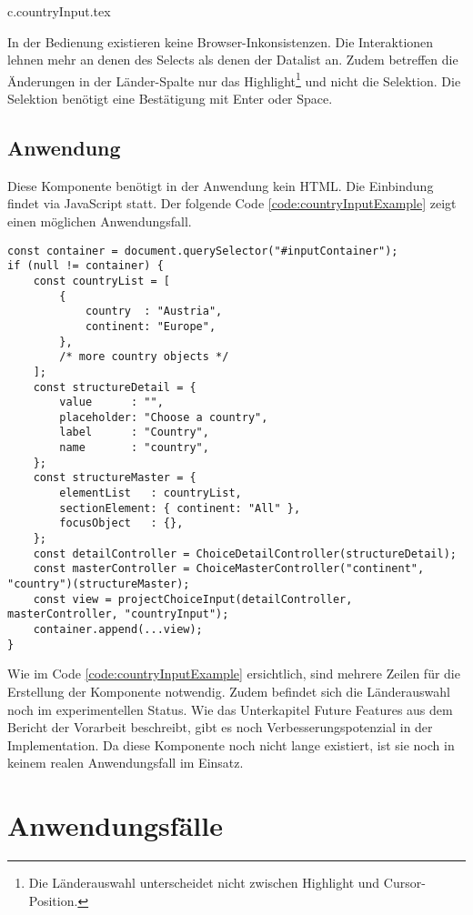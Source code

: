 {c.countryInput.tex}

In der Bedienung existieren keine Browser-Inkonsistenzen. 
Die Interaktionen lehnen mehr an denen des Selects als denen der Datalist an. 
Zudem betreffen die Änderungen in der Länder-Spalte nur das Highlight\footnote{
    Die Länderauswahl unterscheidet nicht zwischen Highlight und Cursor-Position. 
} und nicht die Selektion. 
Die Selektion benötigt eine Bestätigung mit Enter oder Space. 


\subsection{Anwendung}
\label{sec:countryChoiceUse}

Diese Komponente benötigt in der Anwendung kein HTML. 
Die Einbindung findet via JavaScript statt. 
Der folgende Code \ref{code:countryInputExample} zeigt einen möglichen Anwendungsfall. 

\begin{lstlisting}[style = htmlcssjs, caption = Beispiel – Länderauswahl, label = code:countryInputExample]
const container = document.querySelector("#inputContainer");
if (null != container) {
    const countryList = [
        {
            country  : "Austria",
            continent: "Europe",
        },
        /* more country objects */
    ];
    const structureDetail = {
        value      : "",
        placeholder: "Choose a country",
        label      : "Country",
        name       : "country",
    };
    const structureMaster = {
        elementList   : countryList,
        sectionElement: { continent: "All" },
        focusObject   : {},
    };
    const detailController = ChoiceDetailController(structureDetail);
    const masterController = ChoiceMasterController("continent", "country")(structureMaster);
    const view = projectChoiceInput(detailController, masterController, "countryInput");
    container.append(...view);
}
\end{lstlisting}

Wie im Code \ref{code:countryInputExample} ersichtlich, sind mehrere Zeilen für die Erstellung der Komponente notwendig. 
Zudem befindet sich die Länderauswahl noch im experimentellen Status. 
Wie das Unterkapitel Future Features aus dem Bericht\citemarktext{
    [\cite{ip5}]
} der Vorarbeit beschreibt, gibt es noch Verbesserungspotenzial in der Implementation. 
Da diese Komponente noch nicht lange existiert, ist sie noch in keinem realen Anwendungsfall im Einsatz. 


\section{Anwendungsfälle}
\label{sec:useCases}


